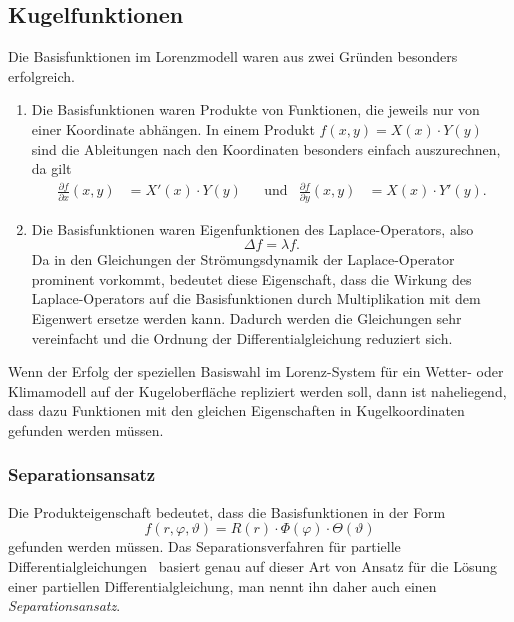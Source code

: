 %
%
%
\subsection{Kugelfunktionen}
Die Basisfunktionen im Lorenzmodell waren aus zwei Gründen besonders
erfolgreich.
\begin{enumerate}
\item
Die Basisfunktionen waren Produkte von Funktionen, die jeweils nur von
einer Koordinate abhängen.
In einem Produkt 
$f(x,y)=X(x)\cdot Y(y)$ 
sind die Ableitungen nach den Koordinaten besonders einfach auszurechnen,
da gilt
\[
\begin{aligned}
\frac{\partial f}{\partial x}(x,y) &= X'(x)\cdot Y(y)
&&\text{und}&
\frac{\partial f}{\partial y}(x,y) &= X(x)\cdot Y'(y).
\end{aligned}
\]
\item
Die Basisfunktionen waren Eigenfunktionen des Laplace-Operators, also
\[
\Delta f = \lambda f.
\]
Da in den Gleichungen der Strömungsdynamik der Laplace-Operator
prominent vorkommt, bedeutet diese Eigenschaft, dass die Wirkung des
Laplace-Operators auf die Basisfunktionen durch Multiplikation mit
dem Eigenwert ersetze werden kann.
Dadurch werden die Gleichungen sehr vereinfacht und die Ordnung
der Differentialgleichung reduziert sich.
\end{enumerate}
Wenn der Erfolg der speziellen Basiswahl im Lorenz-System für ein
Wetter- oder Klimamodell auf der Kugeloberfläche repliziert werden
soll, dann ist naheliegend, dass dazu Funktionen mit den gleichen
Eigenschaften in Kugelkoordinaten gefunden werden müssen.

\subsubsection{Separationsansatz}
Die Produkteigenschaft bedeutet, dass die Basisfunktionen in der Form
\[
f(r,\varphi,\vartheta)
=
R(r)\cdot \Phi(\varphi)\cdot \Theta(\vartheta)
\]
gefunden werden müssen.
Das Separationsverfahren für
partielle Differentialgleichungen~\cite[Chapter 4]{skript:pde}
basiert genau auf dieser Art von Ansatz für die Lösung einer
partiellen Differentialgleichung, man nennt ihn daher auch
einen {\em Separationsansatz}.

